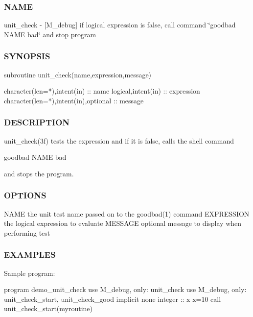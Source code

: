 \subsubsection*{N\+A\+ME}

unit\+\_\+check -\/ \mbox{[}M\+\_\+debug\mbox{]} if logical expression is false, call command \char`\"{}goodbad N\+A\+M\+E bad\char`\"{} and stop program 

\subsubsection*{S\+Y\+N\+O\+P\+S\+IS}

\begin{DoxyVerb}subroutine unit_check(name,expression,message)

 character(len=*),intent(in) :: name
 logical,intent(in) :: expression
 character(len=*),intent(in),optional :: message
\end{DoxyVerb}


\subsubsection*{D\+E\+S\+C\+R\+I\+P\+T\+I\+ON}

\begin{DoxyVerb}unit_check(3f) tests the expression and if it is false, calls the shell command

     goodbad NAME bad

and stops the program.
\end{DoxyVerb}
 \subsubsection*{O\+P\+T\+I\+O\+NS}

N\+A\+ME the unit test name passed on to the goodbad(1) command E\+X\+P\+R\+E\+S\+S\+I\+ON the logical expression to evaluate M\+E\+S\+S\+A\+GE optional message to display when performing test

\subsubsection*{E\+X\+A\+M\+P\+L\+ES}

Sample program\+:

program demo\+\_\+unit\+\_\+check use M\+\_\+debug, only\+: unit\+\_\+check use M\+\_\+debug, only\+: unit\+\_\+check\+\_\+start, unit\+\_\+check\+\_\+good implicit none integer \+:\+: x x=10 call unit\+\_\+check\+\_\+start(\textquotesingle{}myroutine\textquotesingle{})

